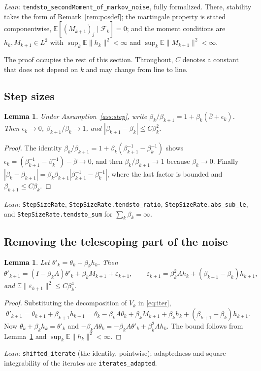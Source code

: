 \documentclass[11pt]{article}
\newtheorem{lemma}[theorem]{Lemma}
\theoremstyle{definition}
\theoremstyle{remark}
\newcommand{\E}{\mathbb{E}}
\newcommand{\F}{\mathcal{F}}
\begin{document}
\noindent\emph{Lean:} \texttt{tendsto\_secondMoment\_of\_markov\_noise}, fully formalized.
There, stability takes the form of Remark~\ref{rem:posdef}; the martingale property is stated
componentwise, $\E[(M_{k+1})_j\mid\F_k] = 0$; and the moment conditions are
$h_k, M_{k+1} \in L^2$ with $\sup_k\E\|h_k\|^2 < \infty$ and $\sup_k\E\|M_{k+1}\|^2 < \infty$.

The proof occupies the rest of this section. Throughout, $C$ denotes a constant that
does not depend on $k$ and may change from line to line.

\subsection{Step sizes}

\begin{lemma}\label{lem:step}
Under Assumption~\ref{ass:step}, write $\beta_k/\beta_{k+1} = 1 + \beta_k(\bar\beta + \epsilon_k)$.
Then $\epsilon_k \to 0$, $\beta_{k+1}/\beta_k \to 1$, and $|\beta_{k+1} - \beta_k| \le C\beta_k^2$.
\end{lemma}
\begin{proof}
The identity $\beta_k/\beta_{k+1} = 1 + \beta_k(\beta_{k+1}^{-1} - \beta_k^{-1})$ shows
$\epsilon_k = (\beta_{k+1}^{-1} - \beta_k^{-1}) - \bar\beta \to 0$, and then
$\beta_k/\beta_{k+1}\to1$ because $\beta_k \to 0$. Finally
$|\beta_k - \beta_{k+1}| = \beta_k\beta_{k+1}|\beta_{k+1}^{-1} - \beta_k^{-1}|$, where the
last factor is bounded and $\beta_{k+1} \le C\beta_k$.
\end{proof}
\noindent\emph{Lean:} \texttt{StepSizeRate}, \texttt{StepSizeRate.tendsto\_ratio},
\texttt{StepSizeRate.abs\_sub\_le}, and \texttt{StepSizeRate.tendsto\_sum} for
$\sum_k\beta_k = \infty$.

\subsection{Removing the telescoping part of the noise}

\begin{lemma}\label{lem:cov}
Let $\theta'_k = \theta_k + \beta_kh_k$. Then
\[
  \theta'_{k+1} = (I - \beta_kA)\theta'_k + \beta_kM_{k+1} + \varepsilon_{k+1},
  \qquad
  \varepsilon_{k+1} = \beta_k^2Ah_k + (\beta_{k+1} - \beta_k)h_{k+1},
\]
and $\E\|\varepsilon_{k+1}\|^2 \le C\beta_k^4$.
\end{lemma}
\begin{proof}
Substituting the decomposition of $V_k$ in \eqref{eq:iter},
\[
  \theta'_{k+1} = \theta_{k+1} + \beta_{k+1}h_{k+1}
  = \theta_k - \beta_kA\theta_k + \beta_kM_{k+1} + \beta_kh_k + (\beta_{k+1} - \beta_k)h_{k+1}.
\]
Now $\theta_k + \beta_kh_k = \theta'_k$ and
$-\beta_kA\theta_k = -\beta_kA\theta'_k + \beta_k^2Ah_k$. The bound follows from
Lemma~\ref{lem:step} and $\sup_k\E\|h_k\|^2 < \infty$.
\end{proof}
\noindent\emph{Lean:} \texttt{shifted\_iterate} (the identity, pointwise); adaptedness and
square integrability of the iterates are \texttt{iterates\_adapted}.
\end{document}
